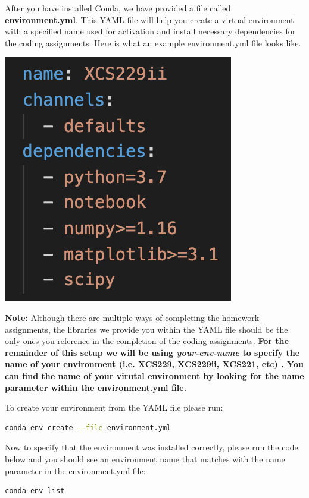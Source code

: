 \documentclass{article}
\begin{document}
After you have installed Conda, we have provided a file called \textbf{environment.yml}. This YAML file will help you create a virtual environment with a specified name used for activation and install necessary dependencies for the coding assignments. Here is what an example environment.yml file looks like.
\begin{center}
\includegraphics[scale=0.75]{conda-update.png}
\end{center}
\textbf{Note: }Although there are multiple ways of completing the homework assignments, the libraries we provide you within the YAML file should be the only ones you reference in the completion of the coding assignments. 
\textbf{For the remainder of this setup we will be using \textit{your-env-name} to specify the name of your environment (i.e. XCS229, XCS229ii, XCS221, etc) . You can find the name of your virutal environment by looking for the name parameter within the environment.yml file.} 

To create your environment from the YAML file please run: 
\begin{lstlisting}[language=bash]
conda env create --file environment.yml
\end{lstlisting}
Now to specify that the environment was installed correctly, please run the code below and you should see an environment name that matches with the name parameter in the environment.yml file:
\begin{lstlisting}[language=bash]
conda env list
\end{lstlisting}
\end{document}
